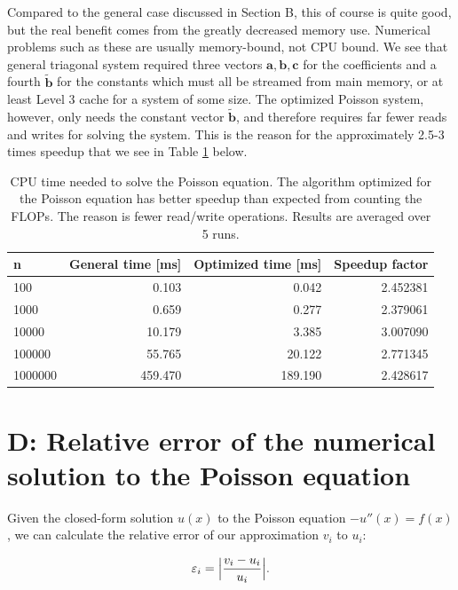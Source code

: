 \documentclass[]{article}
\begin{document}
Compared to the general case discussed in Section B, this of course is quite good, but the real benefit comes from the greatly decreased memory use. Numerical problems such as these are usually memory-bound, not CPU bound. We see that general triagonal system required three vectors $\mathbf{a},\mathbf{b},\mathbf{c}$ for the coefficients and a fourth $\mathbf{\tilde{b}}$ for the constants which must all be streamed from main memory, or at least Level 3 cache for a system of some size. The optimized Poisson system, however, only needs the constant vector $\mathbf{\tilde{b}}$, and therefore requires far fewer reads and writes for solving the system. This is the reason for the approximately 2.5-3 times speedup that we see in Table \ref{tab:CPU-times} below.


\begin{table}[ht]
\caption{CPU time needed to solve the Poisson equation. The algorithm optimized for the Poisson equation has better speedup than expected from counting the FLOPs. The reason is fewer read/write operations. Results are averaged over 5 runs.}
\label{tab:CPU-times}
\begin{center}
\begin{tabular}{lrrr}
	\toprule
	n &  General time [ms] &  Optimized time [ms] & Speedup factor \\
	\midrule
	100     &    0.103 &    0.042 &  2.452381 \\
	1000    &    0.659 &    0.277 &  2.379061 \\
	10000   &   10.179 &    3.385 &  3.007090 \\
	100000  &   55.765 &   20.122 &  2.771345 \\
	1000000 &  459.470 &  189.190 &  2.428617 \\
	\bottomrule
\end{tabular}
\end{center}
\end{table}


\section*{D: Relative error of the numerical solution to the Poisson equation}
Given the closed-form solution $u(x)$ to the Poisson equation $-u''(x) = f(x)$, we can calculate the relative error of our approximation $v_i$ to $u_i$:

\begin{equation*}
\varepsilon_{i} = \Bigl \lvert \frac{v_i - u_i}{u_i} \Bigr \rvert \text{.}
\end{equation*}
\end{document}
